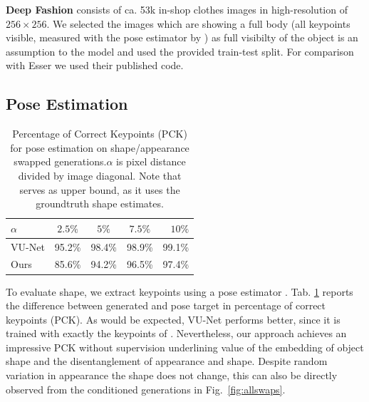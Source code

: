 		\begin{tcolorbox}
			\textbf{Deep Fashion} \cite{liu16deepfashion, liu16deepfashionwild} consists of ca. 53k in-shop clothes images in high-resolution of $256 \times 256$. We selected the images which are showing a full body (all keypoints visible, measured with the pose estimator by \cite{cao17affinityfield}) as full visibilty of the object is an assumption to the model and used the provided train-test split. For comparison with Esser \etal \cite{esser18} we used their published code.
		\end{tcolorbox}

	\subsection{Pose Estimation}

		\begin{table}[htp]
			\centering
			\caption{Percentage of Correct Keypoints (PCK) for pose estimation on shape/appearance swapped generations.\;$\alpha$ is pixel distance divided by image diagonal. Note that \cite{esser18} serves as upper bound, as it uses the groundtruth shape estimates.}
			\label{tab:pose}
			\begin{tabular}{l|cccr}
				\hline
				$\alpha$ & $2.5\%$ &  $5\%$ & $7.5\%$ & $10\%$ \\ \hline
				VU-Net \cite{esser18} & {95.2}\% & {98.4}\% & {98.9}\% & {99.1}\% \\
				Ours & 85.6\% & 94.2\% &96.5\% & 97.4\% \\ \hline
			\end{tabular}
		\end{table}


		To evaluate shape, we extract keypoints using a pose estimator \cite{cao17affinityfield}. Tab. \ref{tab:pose} reports the difference between generated and pose target in percentage of correct keypoints (PCK).
		As would be expected, VU-Net performs better, since it is trained with exactly the keypoints of \cite{cao17affinityfield}. Nevertheless, our approach achieves an impressive PCK without supervision underlining value of the embedding of object shape and the disentanglement of appearance and shape. Despite random variation in appearance the shape does not change, this can also be directly observed from the conditioned generations in Fig.~\ref{fig:allswaps}.


